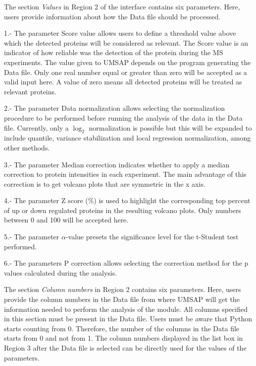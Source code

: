 The section \textit{Values} in Region \num{2} of the interface contains six parameters. Here, users provide information about how the Data file should be processed.

\num{1}.- The parameter Score value\label{par:protprofScoreValue} allows users to define a threshold value above which the detected proteins will be considered as relevant. The Score value is an indicator of how reliable was the detection of the protein during the MS experiments. The value given to UMSAP depends on the program generating the Data file. Only one real number equal or greater than zero will be accepted as a valid input here. A value of zero means all detected proteins will be treated as relevant proteins.

\num{2}.-  The parameter Data normalization allows selecting the normalization procedure to be performed before running the analysis of the data in the Data file. Currently, only a $\log_2$ normalization is possible but this will be expanded to include quantile, variance stabilization and local regression normalization, among other methods. 

\num{3}.- The parameter Median correction indicates whether to apply a median correction to protein intensities in each experiment. The main advantage of this correction is to get volcano plots that are symmetric in the x axis.

\num{4}.- The parameter Z score (\%) is used to highlight the corresponding top percent of up or down regulated proteins in the resulting volcano plots. Only numbers between 0 and 100 will be accepted here.

\num{5}.- The parameter $\alpha$-value presets the significance level for the t-Student test performed.

\num{6}.- The parameters P correction allows selecting the correction method for the p values calculated during the analysis. 

The section \textit{Column numbers} in Region \num{2} contains six parameters. Here, users provide the column numbers in the Data file from where UMSAP will get the information needed to perform the analysis of the module. All columns specified in this section must be present in the Data file. Users must be aware that Python starts counting from \num{0}. Therefore, the number of the columns in the Data file starts from \num{0} and not from \num{1}. The column numbers displayed in the list box in Region \num{3} after the Data file is selected can be directly used for the values of the parameters. 

